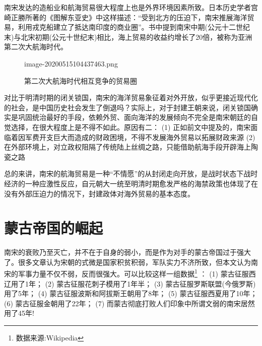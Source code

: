 \documentclass[final]{cvpr}
\begin{document}
南宋发达的造船业和航海贸易很大程度上也是外界环境因素所致。日本历史学者宫崎正勝所著的《图解东亚史》\cite{图解东亚史}中这样描述：“受到北方的压迫下，南宋推展海洋贸易，利用戎克船建立了抵达南印度的商业圈”。书中提到南宋中期(公元十二世纪末)与北宋初期(公元十世纪末)相比，海上贸易的收益约增长了20倍，被称为亚洲第二次大航海时代。

\begin{figure}[h]
  	\begin{overpic}[width=\columnwidth]{image-20200515104437463.png}
    \end{overpic}
    \caption{第二次大航海时代相互竞争的贸易圈
    }\label{fig:colorFre}
\end{figure}

对比于明清时期的闭关锁国，南宋的海洋贸易象征着对外开放，似乎更接近现代化的社会，是中国历史社会发生了倒退吗？实际上，对于封建王朝来说，闭关锁国确实是巩固统治最好的手段，依赖外贸、面向海洋的发展倾向不完全是南宋朝廷的自觉选择\cite{战时状态}，在很大程度上是不得不如此。原因有二：\newline
(1) 正如前文中提及的，南宋面临着因军费开支巨大而造成的财政困境，不得不发展海外贸易以拓展财政来源\newline
(2) 在外部环境上，对立政权阻隔了传统陆上丝绸之路，只能借助航海手段开辟海上陶瓷之路

总的来讲，南宋的航海贸易是一种“不情愿”的从封闭走向开放，是战时状态下战时经济的一种应激性反应，自元朝大一统至明清时期愈发严格的海禁政策也体现了在没有外部压迫力的情况下，封建政体对海外贸易的基本态度。

\section{蒙古帝国的崛起}

南宋的衰败乃至灭亡，并不在于自身的弱小，而是作为对手的蒙古帝国过于强大了。很多文章认为宋朝的式微是国家积贫积弱，军队实力不济所致，但本文认为南宋的军事力量不仅不弱，反而很强大。可以比较这样一组数据\footnote{数据来源:Wikipedia} \cite{蒙古帝国}：\newline
(1) 蒙古征服西辽用了1年；\newline
(2) 蒙古征服花刺子模用了1年半；\newline
(3) 蒙古征服罗斯联盟(今俄罗斯)用了5年；\newline
(4) 蒙古征服波斯和阿拔斯王朝用了8年；\newline
(5) 蒙古征服西夏用了10年；\newline
(6) 蒙古征服金朝用了22年；\newline
(7) 而蒙古彻底打败人们印象中所谓文弱的南宋居然用了45年! 
\end{document}
